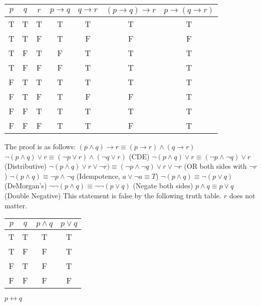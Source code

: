 \documentclass{article}
\begin{document}
\begin{outline}[enumerate]
        \begin{tabular}{c | c | c | c | c | c | c}
            $p$ & 
            $q$ & 
            $r$ & 
            $p \rightarrow q$ & 
            $q \rightarrow r$ & 
            $(p \rightarrow q) \rightarrow r$ & 
            $p \rightarrow (q \rightarrow r)$ \\ 
            \hline
            T & T & T & T & T & T & T \\
            T & T & F & T & F & F & F \\
            T & F & T & F & T & T & T \\
            T & F & F & F & T & T & T \\
            F & T & T & T & T & T & T \\
            F & T & F & T & F & F & T \\
            F & F & T & T & T & T & T \\
            F & F & F & T & T & F & T \\
        \end{tabular}
        \2 The proof is as follows:
            \3 $(p \wedge q) \rightarrow r \equiv (p \rightarrow r) \wedge (q \rightarrow r)$ 
            \3 $\neg (p \wedge q) \vee r \equiv (\neg p \vee r) \wedge (\neg q \vee r)$ (CDE) 
            \3 $\neg (p \wedge q) \vee r \equiv (\neg p \wedge \neg q) \vee r$ (Distributive) 
            \3 $\neg (p \wedge q) \vee r \vee \neg r) \equiv (\neg p \wedge \neg q) \vee r \vee \neg r$ (OR both sides with $\neg r$) 
            \3 $\neg (p \wedge q) \equiv \neg p \wedge \neg q$ (Idempotence, $a \vee \neg a \equiv T$) 
            \3 $\neg (p \wedge q) \equiv \neg (p \vee q)$ (DeMorgan's) 
            \3 $\neg\neg (p \wedge q) \equiv \neg\neg (p \vee q)$ (Negate both sides) 
            \3 $p \wedge q \equiv p \vee q$ (Double Negative)
            \3 This statement is false by the following truth table. $r$ does not matter. \\
            \begin{tabular}{c | c | c | c}
            $p$ & $q$ & $p \wedge q$ & $p \vee q$  \\
            \hline
            T & T & T & T \\
            T & F & F & T \\
            F & T & F & T \\
            F & F & F & F \\
        \end{tabular}
    \1
        \2 
            $p \leftrightarrow q$ \\

\end{outline}
\end{document}
